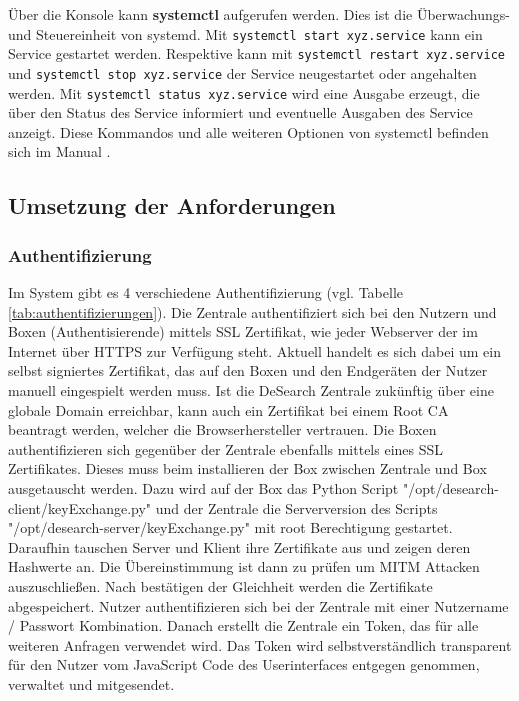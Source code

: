 Über die Konsole kann \textbf{systemctl} aufgerufen werden. Dies ist die Überwachungs- und Steuereinheit von systemd. Mit \texttt{systemctl start xyz.service} kann ein Service gestartet werden. Respektive kann mit  \texttt{systemctl restart xyz.service} und \texttt{systemctl stop xyz.service} der Service neugestartet oder angehalten werden. Mit  \texttt{systemctl status xyz.service} wird eine Ausgabe erzeugt, die über den Status des Service informiert und eventuelle Ausgaben des Service anzeigt. Diese Kommandos und alle weiteren Optionen von systemctl befinden sich im Manual \citep[][]{systemctl-man}.

\subsection{Umsetzung der Anforderungen}

\subsubsection{Authentifizierung} \label{cap:authentifizierung}
Im System gibt es 4 verschiedene Authentifizierung (vgl. Tabelle \ref{tab:authentifizierungen}).\newline
Die Zentrale authentifiziert sich bei den Nutzern und Boxen (Authentisierende) mittels SSL Zertifikat, wie jeder Webserver der im Internet über HTTPS zur Verfügung steht. Aktuell handelt es sich dabei um ein selbst signiertes Zertifikat, das auf den Boxen und den Endgeräten der Nutzer manuell eingespielt werden muss. Ist die DeSearch Zentrale zukünftig über eine globale Domain erreichbar, kann auch ein Zertifikat bei einem Root CA beantragt werden, welcher die Browserhersteller vertrauen. \newline
Die Boxen authentifizieren sich gegenüber der Zentrale ebenfalls mittels eines SSL Zertifikates.
Dieses muss beim installieren der Box zwischen Zentrale und Box ausgetauscht werden. Dazu wird auf der Box das Python Script "/opt/desearch-client/keyExchange.py" und der Zentrale die Serverversion des Scripts "/opt/desearch-server/keyExchange.py" mit root Berechtigung gestartet. Daraufhin tauschen Server und Klient ihre Zertifikate aus und zeigen deren Hashwerte an. Die Übereinstimmung ist dann zu prüfen um MITM Attacken auszuschließen. Nach bestätigen der Gleichheit werden die Zertifikate abgespeichert. \newline
Nutzer authentifizieren sich bei der Zentrale mit einer Nutzername / Passwort Kombination. Danach erstellt die Zentrale ein Token, das für alle weiteren Anfragen verwendet wird. Das Token wird selbstverständlich transparent für den Nutzer vom JavaScript Code des Userinterfaces entgegen genommen, verwaltet und mitgesendet.

